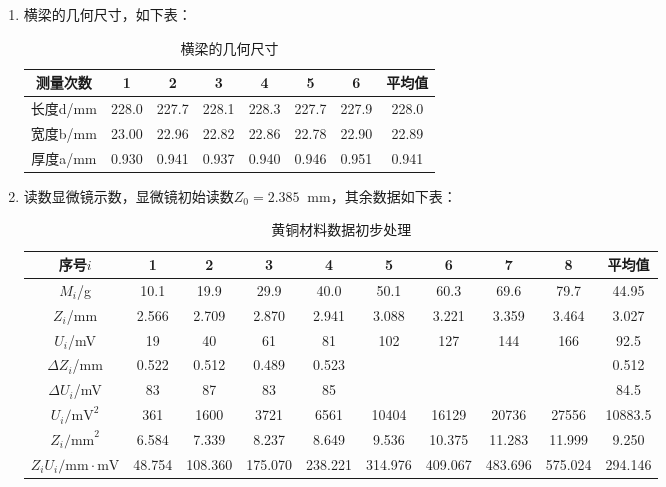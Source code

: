 \documentclass[11pt]{article}
\newcommand*{\unit}[1]{\mathop{}\!\mathrm{#1}}
\begin{document}
\begin{enumerate}
    \item 横梁的几何尺寸，如下表：
    
    \begin{table}[H]
        \centering
        \begin{tabular}{|c|c|c|c|c|c|c|c|}
            \hline
            测量次数&1&2&3&4&5&6&平均值\\
            \hline
            长度d/mm&228.0  & 227.7  & 228.1  & 228.3  & 227.7  & 227.9  & 228.0    \\
            \hline
            宽度b/mm&23.00  & 22.96  & 22.82  & 22.86  & 22.78  & 22.90  & 22.89  \\
            \hline
            厚度a/mm&0.930  & 0.941  & 0.937  & 0.940  & 0.946  & 0.951  & 0.941   \\
            \hline
        \end{tabular}
        \caption{横梁的几何尺寸}
    \end{table}

    \item 读数显微镜示数，显微镜初始读数$Z_0 = 2.385 \unit{mm}$，其余数据如下表：
    
    \begin{table}[H]
        \centering
        \begin{tabular}{|c|c|c|c|c|c|c|c|c|c|}
            \hline
            序号$i$&1&2&3&4&5&6&7&8&平均值\\
            \hline
            $M_i$/g&10.1  & 19.9  & 29.9  & 40.0  & 50.1  & 60.3  & 69.6  & 79.7  & 44.95\\
            \hline
            $Z_i$/mm&2.566  & 2.709  & 2.870  & 2.941  & 3.088  & 3.221  & 3.359  & 3.464  & 3.027  \\
            \hline
            $U_i$/mV&19    & 40    & 61    & 81    & 102   & 127   & 144   & 166   & 92.5  \\
            \hline
            $\Delta Z_i$/mm&0.522  & 0.512  & 0.489  & 0.523  &       &       &       &       & 0.512  \\
            \hline
            $\Delta U_i$/mV&83    & 87    & 83    & 85    &       &       &       &       & 84.5  \\
            \hline
            $U_i \text{/mV}^2$&361   & 1600  & 3721  & 6561  & 10404 & 16129 & 20736 & 27556 & 10883.5 \\
            \hline
            $Z_i \text{/mm}^2$&6.584  & 7.339  & 8.237  & 8.649  & 9.536  & 10.375  & 11.283  & 11.999  & 9.250\\
            \hline
            $Z_i U_i \text{/mm} \cdot \text{mV}$&48.754  & 108.360  & 175.070  & 238.221  & 314.976  & 409.067  & 483.696  & 575.024  & 294.146  \\
            \hline
        \end{tabular}
        \caption{黄铜材料数据初步处理}
    \end{table}
\end{enumerate}
\end{document}
